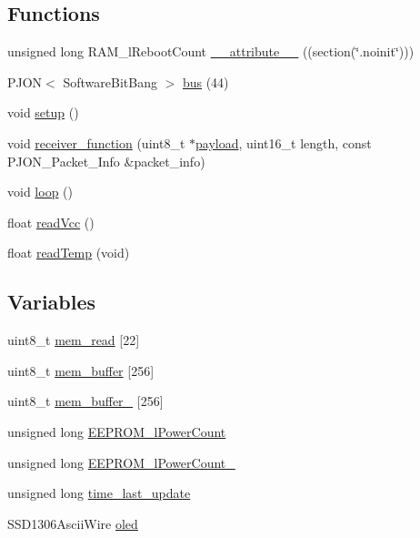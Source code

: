 \subsection*{Functions}
\begin{DoxyCompactItemize}
\item 
unsigned long R\-A\-M\-\_\-l\-Reboot\-Count \hyperlink{OWP__DG__LCD__Sensors_8ino_a847f3a8299d97aab23bf6c8ddb599b0c}{\-\_\-\-\_\-attribute\-\_\-\-\_\-} ((section(\char`\"{}.noinit\char`\"{})))
\item 
P\-J\-O\-N$<$ Software\-Bit\-Bang $>$ \hyperlink{OWP__DG__LCD__Sensors_8ino_a538cbe881a4c2d02f3bd441059c41ec4}{bus} (44)
\item 
void \hyperlink{OWP__DG__LCD__Sensors_8ino_a4fc01d736fe50cf5b977f755b675f11d}{setup} ()
\item 
void \hyperlink{OWP__DG__LCD__Sensors_8ino_a76fc5e73c141f748dcc1809fdcfa1714}{receiver\-\_\-function} (uint8\-\_\-t $\ast$\hyperlink{Uno__Dragino__LoRa__GPS__Shield__TTN_8ino_a78a402d1762842473567de90b11ed256}{payload}, uint16\-\_\-t length, const P\-J\-O\-N\-\_\-\-Packet\-\_\-\-Info \&packet\-\_\-info)
\item 
void \hyperlink{OWP__DG__LCD__Sensors_8ino_afe461d27b9c48d5921c00d521181f12f}{loop} ()
\item 
float \hyperlink{OWP__DG__LCD__Sensors_8ino_a0b3195c3893f02cb1b80d878b89549d6}{read\-Vcc} ()
\item 
float \hyperlink{OWP__DG__LCD__Sensors_8ino_ada109bb0cdc12131465dfe7a74f93b1e}{read\-Temp} (void)
\end{DoxyCompactItemize}
\subsection*{Variables}
\begin{DoxyCompactItemize}
\item 
uint8\-\_\-t \hyperlink{OWP__DG__LCD__Sensors_8ino_a509b1a771f43a48a82f722cd6e515b05}{mem\-\_\-read} \mbox{[}22\mbox{]}
\item 
uint8\-\_\-t \hyperlink{OWP__DG__LCD__Sensors_8ino_a02235b4e96743403348a58d554caa3dc}{mem\-\_\-buffer} \mbox{[}256\mbox{]}
\item 
uint8\-\_\-t \hyperlink{OWP__DG__LCD__Sensors_8ino_a4dd1004253345555aef9782ac96c4258}{mem\-\_\-buffer\-\_\-} \mbox{[}256\mbox{]}
\item 
unsigned long \hyperlink{OWP__DG__LCD__Sensors_8ino_a8e8831540fa7e8693d43b390f4d3ce84}{E\-E\-P\-R\-O\-M\-\_\-l\-Power\-Count}
\item 
unsigned long \hyperlink{OWP__DG__LCD__Sensors_8ino_af0e04e8ff30374f495431fdaa358f8b4}{E\-E\-P\-R\-O\-M\-\_\-l\-Power\-Count\-\_\-}
\item 
unsigned long \hyperlink{OWP__DG__LCD__Sensors_8ino_a65605eb57f7500313270f147580cf26c}{time\-\_\-last\-\_\-update}
\item 
S\-S\-D1306\-Ascii\-Wire \hyperlink{OWP__DG__LCD__Sensors_8ino_ad5f8b489b649f5974de70af2a799aee4}{oled}
\end{DoxyCompactItemize}


